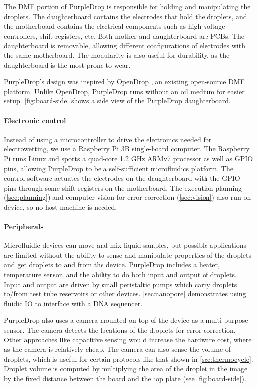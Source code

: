 \documentclass[sigplan, screen]{acmart}
\begin{document}
The DMF portion of PurpleDrop is responsible for holding and manipulating the droplets.
The daughterboard contains the electrodes that hold the droplets, and the motherboard contains the electrical components such as high-voltage controllers, shift registers, etc.
Both mother and daughterboard are PCBs.
The daughterboard is removable, allowing different configurations of electrodes with the same motherboard.
The modularity is also useful for durability, as the daughterboard is the most prone to wear.

PurpleDrop's design was inspired by OpenDrop \cite{opendrop}, an existing open-source DMF platform.
Unlike OpenDrop, PurpleDrop runs without an oil medium for easier setup.
\autoref{fig:board-side} shows a side view of the PurpleDrop daughterboard.

\paragraph{Electronic control}

Instead of using a microcontroller to drive the electronics needed for electrowetting, we use a Raspberry Pi 3B \cite{raspberry-pi-3b} single-board computer.
The Raspberry Pi runs Linux and sports a quad-core 1.2 GHz ARMv7 processor as well as GPIO pins, allowing PurpleDrop to be a self-sufficient microfluidics platform.
The control software actuates the electrodes on the daughterboard with the GPIO pins through some shift registers on the motherboard.
The execution planning (\autoref{sec:planning}) and computer vision for error correction (\autoref{sec:vision}) also run on-device, so no host machine is needed.

\paragraph{Peripherals}

Microfluidic devices can move and mix liquid samples, but possible applications are limited without the ability to sense and manipulate properties of the droplets and get droplets to and from the device.
PurpleDrop includes a heater, temperature sensor, and the ability to do both input and output of droplets.
Input and output are driven by small peristaltic pumps which carry droplets to/from test tube reservoirs or other devices.
\autoref{sec:nanopore} demonstrates using fluidic IO to interface with a DNA sequencer.

PurpleDrop also uses a camera mounted on top of the device as a multi-purpose sensor.
The camera detects the locations of the droplets for error correction.
Other approaches like capacitive sensing \cite{bhattacharjee2012capacitance} would increase the hardware cost, where as the camera is relatively cheap.
The camera can also sense the volume of droplets, which is useful for certain protocols like that shown in \autoref{sec:thermocycle}.
Droplet volume is computed by multiplying the area of the droplet in the image by the fixed distance between the board and the top plate (see \autoref{fig:board-side}).
\end{document}

